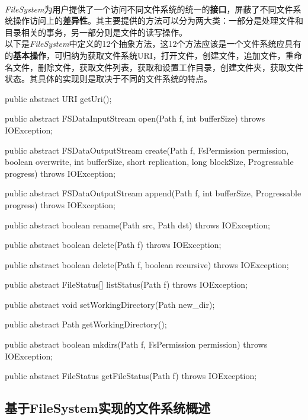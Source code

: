     \\
    \textit{FileSystem}为用户提供了一个访问不同文件系统的统一的\textbf{接口}，屏蔽了不同文件系统操作访问上的\textbf{差异性}。其主要提供的方法可以分为两大类：一部分是处理文件和目录相关的事务，另一部分则是文件的读写操作。\\
    以下是\textit{FileSystem}中定义的12个抽象方法，这12个方法应该是一个文件系统应具有的\textbf{基本操作}，可归纳为获取文件系统URI，打开文件，创建文件，追加文件，重命名文件，删除文件，获取文件列表，获取和设置工作目录，创建文件夹，获取文件状态。其具体的实现则是取决于不同的文件系统的特点。
    \begin{java}[caption=FileSystem abstract method]
public abstract URI getUri();

public abstract FSDataInputStream open(Path f, int bufferSize) throws IOException;

public abstract FSDataOutputStream create(Path f,
    FsPermission permission,
    boolean overwrite,
    int bufferSize,
    short replication,
    long blockSize,
    Progressable progress) throws IOException;

public abstract FSDataOutputStream append(Path f, int bufferSize, Progressable progress) throws IOException;

public abstract boolean rename(Path src, Path dst) throws IOException;

public abstract boolean delete(Path f) throws IOException;

public abstract boolean delete(Path f, boolean recursive) throws IOException;

public abstract FileStatus[] listStatus(Path f) throws IOException;

public abstract void setWorkingDirectory(Path new_dir);

public abstract Path getWorkingDirectory();

public abstract boolean mkdirs(Path f, FsPermission permission) throws IOException;

public abstract FileStatus getFileStatus(Path f) throws IOException;

    \end{java}

\subsection{基于FileSystem实现的文件系统概述}
